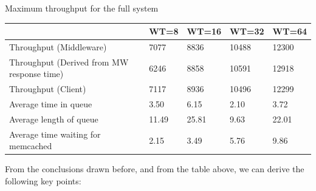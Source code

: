 \documentclass[11pt,a4paper]{article}
\begin{document}
\begin{center}
	{Maximum throughput for the full system}
	\begin{tabular}{|l|p{1.5cm}|p{1.5cm}|p{1.5cm}|p{1.5cm}|}
		\hline                                            & WT=8 & WT=16 & WT=32 & WT=64 \\ 
		\hline Throughput (Middleware)                    & 7077 & 8836  & 10488 & 12300 \\ 
		\hline Throughput (Derived from MW response time) & 6246 & 8858  & 10591 & 12918 \\ 
		\hline Throughput (Client)                        & 7117 & 8936  & 10496 & 12299 \\ 
		\hline Average time in queue                      & 3.50 & 6.15  & 2.10  & 3.72  \\ 
		\hline Average length of queue                    &11.49 & 25.81 & 9.63  & 22.01 \\ 
		\hline Average time waiting for memcached         & 2.15 & 3.49  & 5.76  & 9.86  \\ 
		\hline 
	\end{tabular}
\end{center}

From the conclusions drawn before, and from the table above, we can derive the
following key points:
\end{document}
